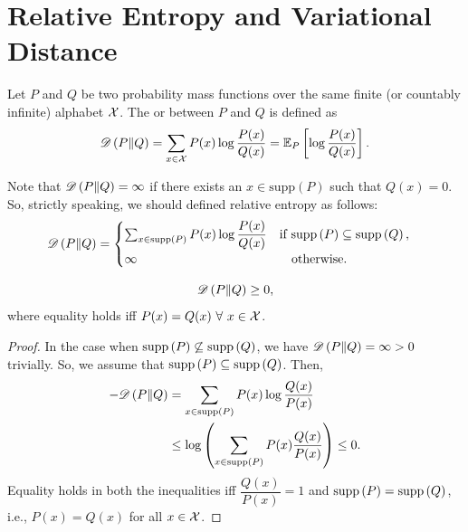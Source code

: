 \documentclass[11pt,a4paper]{article}
\begin{document}
\begin{theorem}
    
\end{theorem}

\section{Relative Entropy and Variational Distance}

\begin{definition}
    Let $P$ and $Q$ be two probability mass functions over the same finite (or countably infinite) alphabet $\mathcal{X}$. The  or  between $P$ and $Q$ is defined as 
    \begin{equation*}
        \mathscr{D} \left(P\|Q\right) = \sum_{x\in\mathcal{X}} P(x) \log \dfrac{P(x)}{Q(x)} = \mathbb{E}_P\left[ \log \dfrac{P(x)}{Q(x)} \right].
    \end{equation*}
\end{definition}

\begin{remark}
    Note that $\mathscr{D} \left(P\|Q\right) = \infty$ if there exists an $x\in \text{supp}(P)$ such that $Q(x) = 0$. So, strictly speaking, we should defined relative entropy as follows:
    \begin{equation*}
        \divergence{P}{Q} = \begin{cases}
            \sum_{x\in\supp{P}} P(x) \log \dfrac{P(x)}{Q(x)} \quad\text{if }\supp{P} \subseteq \supp{Q}, \\
            \infty \hspace{4.3cm} \text{otherwise}.
        \end{cases}
    \end{equation*}
\end{remark}

\begin{theorem}
    \begin{equation*}
        \mathscr{D} \left(P\|Q\right) \ge 0,
    \end{equation*}
    where equality holds iff $P(x) = Q(x)\ \forall\ x\in \mathcal{X}$.
\end{theorem}

\begin{proof}
    In the case when $\text{supp}\left( P \right)\not\subseteq \text{supp}\left( Q \right)$, we have $\mathscr{D} \left(P\|Q\right) = \infty > 0$ trivially. So, we assume that $\text{supp}\left( P \right)\subseteq \text{supp}\left( Q \right)$. Then, 
    \begin{align*}
        -\mathscr{D} \left(P\|Q\right) &= \sum_{x\in\text{supp}\left( P \right)} P(x) \log \dfrac{Q(x)}{P(x)} \\
        &\le \log \left(\sum_{x\in\text{supp}\left( P \right)} P(x) \dfrac{Q(x)}{P(x)}\right) \le 0.
    \end{align*}
    Equality holds in both the inequalities iff $\dfrac{Q(x)}{P(x)} = 1$ and $\text{supp}\left( P \right) = \text{supp}\left( Q \right)$, i.e., $P(x) = Q(x)$ for all $x\in\mathcal{X}$.
\end{proof}
\end{document}
